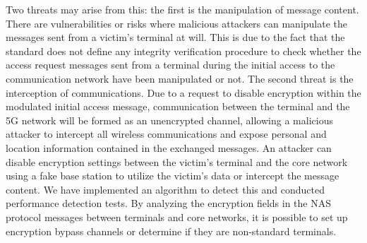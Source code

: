 \documentclass[english]{article}
\begin{document}
Two threats may arise from this: the first is the manipulation of message
content. There are vulnerabilities or risks where malicious attackers can
manipulate the messages sent from a victim's terminal at will. This is due to
the fact that the standard does not define any integrity verification procedure
to check whether the access request messages sent from a terminal during the
initial access to the communication network have been manipulated or not. The
second threat is the interception of communications. Due to a request to
disable encryption within the modulated initial access message, communication
between the terminal and the 5G network will be formed as an unencrypted
channel, allowing a malicious attacker to intercept all wireless communications
and expose personal and location information contained in the exchanged
messages. An attacker can disable encryption settings between the victim's
terminal and the core network using a fake base station to utilize the victim's
data or intercept the message content. We have implemented an algorithm to
detect this and conducted performance detection tests. By analyzing the
encryption fields in the NAS protocol messages between terminals and core
networks, it is possible to set up encryption bypass channels or determine if
they are non-standard terminals.
\end{document}
